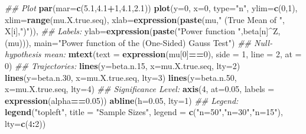 \documentclass[]{book}
\newenvironment{Shaded}{\begin{snugshade}}{\end{snugshade}}
\newcommand{\CommentTok}[1]{\textcolor[rgb]{0.56,0.35,0.01}{\textit{#1}}}
\newcommand{\DataTypeTok}[1]{\textcolor[rgb]{0.13,0.29,0.53}{#1}}
\newcommand{\DecValTok}[1]{\textcolor[rgb]{0.00,0.00,0.81}{#1}}
\newcommand{\FloatTok}[1]{\textcolor[rgb]{0.00,0.00,0.81}{#1}}
\newcommand{\KeywordTok}[1]{\textcolor[rgb]{0.13,0.29,0.53}{\textbf{#1}}}
\newcommand{\NormalTok}[1]{#1}
\newcommand{\OperatorTok}[1]{\textcolor[rgb]{0.81,0.36,0.00}{\textbf{#1}}}
\newcommand{\StringTok}[1]{\textcolor[rgb]{0.31,0.60,0.02}{#1}}
\theoremstyle{definition}
\theoremstyle{definition}
\theoremstyle{definition}
\theoremstyle{remark}
\begin{document}
\begin{Shaded}
\begin{Highlighting}[]
\CommentTok{## Plot}
\KeywordTok{par}\NormalTok{(}\DataTypeTok{mar=}\KeywordTok{c}\NormalTok{(}\FloatTok{5.1}\NormalTok{,}\FloatTok{4.1}\OperatorTok{+}\DecValTok{1}\NormalTok{,}\FloatTok{4.1}\NormalTok{,}\FloatTok{2.1}\NormalTok{))}
\KeywordTok{plot}\NormalTok{(}\DataTypeTok{y=}\DecValTok{0}\NormalTok{, }\DataTypeTok{x=}\DecValTok{0}\NormalTok{, }\DataTypeTok{type=}\StringTok{"n"}\NormalTok{,}
     \DataTypeTok{ylim=}\KeywordTok{c}\NormalTok{(}\DecValTok{0}\NormalTok{,}\DecValTok{1}\NormalTok{),}
     \DataTypeTok{xlim=}\KeywordTok{range}\NormalTok{(mu.X.true.seq), }
     \DataTypeTok{xlab=}\KeywordTok{expression}\NormalTok{(}\KeywordTok{paste}\NormalTok{(mu,}\StringTok{" (True Mean of "}\NormalTok{, X[i],}\StringTok{")"}\NormalTok{)), }
     \CommentTok{## Labels:}
     \DataTypeTok{ylab=}\KeywordTok{expression}\NormalTok{(}\KeywordTok{paste}\NormalTok{(}\StringTok{"Power function "}\NormalTok{,beta[n]}\OperatorTok{^}\NormalTok{Z,(mu))), }
     \DataTypeTok{main=}\StringTok{"Power function of the (One-Sided) Gauss Test"}\NormalTok{)}
\CommentTok{## Null-hypothesis mean:}
\KeywordTok{mtext}\NormalTok{(}\DataTypeTok{text =} \KeywordTok{expression}\NormalTok{(mu[}\DecValTok{0}\NormalTok{]}\OperatorTok{==}\DecValTok{0}\NormalTok{), }\DataTypeTok{side =} \DecValTok{1}\NormalTok{, }\DataTypeTok{line =} \DecValTok{2}\NormalTok{, }\DataTypeTok{at =} \DecValTok{0}\NormalTok{)}
\CommentTok{## Trajectories:}
\KeywordTok{lines}\NormalTok{(}\DataTypeTok{y=}\NormalTok{beta.n}\FloatTok{.15}\NormalTok{, }\DataTypeTok{x=}\NormalTok{mu.X.true.seq, }\DataTypeTok{lty=}\DecValTok{2}\NormalTok{)}
\KeywordTok{lines}\NormalTok{(}\DataTypeTok{y=}\NormalTok{beta.n}\FloatTok{.30}\NormalTok{, }\DataTypeTok{x=}\NormalTok{mu.X.true.seq, }\DataTypeTok{lty=}\DecValTok{3}\NormalTok{)}
\KeywordTok{lines}\NormalTok{(}\DataTypeTok{y=}\NormalTok{beta.n}\FloatTok{.50}\NormalTok{, }\DataTypeTok{x=}\NormalTok{mu.X.true.seq, }\DataTypeTok{lty=}\DecValTok{4}\NormalTok{)}
\CommentTok{## Significance Level:}
\KeywordTok{axis}\NormalTok{(}\DecValTok{4}\NormalTok{, }\DataTypeTok{at=}\FloatTok{0.05}\NormalTok{, }\DataTypeTok{labels =} \KeywordTok{expression}\NormalTok{(alpha}\OperatorTok{==}\FloatTok{0.05}\NormalTok{))}
\KeywordTok{abline}\NormalTok{(}\DataTypeTok{h=}\FloatTok{0.05}\NormalTok{, }\DataTypeTok{lty=}\DecValTok{1}\NormalTok{)}
\CommentTok{## Legend:}
\KeywordTok{legend}\NormalTok{(}\StringTok{"topleft"}\NormalTok{, }\DataTypeTok{title =} \StringTok{"Sample Sizes"}\NormalTok{, }
       \DataTypeTok{legend =} \KeywordTok{c}\NormalTok{(}\StringTok{"n=50"}\NormalTok{,}\StringTok{"n=30"}\NormalTok{,}\StringTok{"n=15"}\NormalTok{), }
       \DataTypeTok{lty=}\KeywordTok{c}\NormalTok{(}\DecValTok{4}\OperatorTok{:}\DecValTok{2}\NormalTok{))}
\end{Highlighting}
\end{Shaded}
\end{document}
